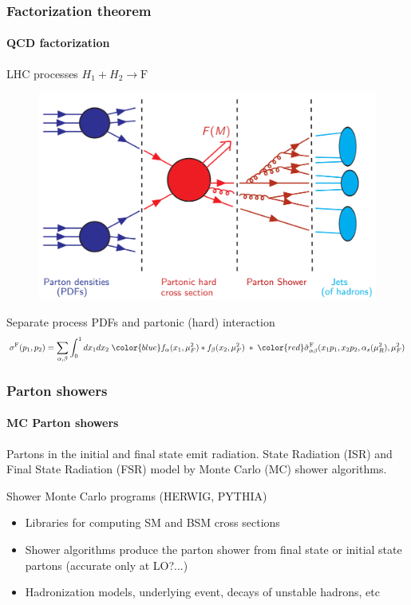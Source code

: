 \documentclass[aspectratio=43]{beamer}
\begin{document}
\begin{frame}

	\frametitle{Factorization theorem}
	\framesubtitle{QCD factorization}
	
	\center \footnotesize LHC processes $H_{1} + H_{2} \rightarrow \textrm{F}$
	
	\begin{figure}
		\includegraphics[width = 7 cm]{plots/factorization_1.png}
	\end{figure}
	
	\footnotesize {Separate process {\color{blue}PDFs} and {\color{red} partonic (hard) interaction}	
	\begin{equation}
		\sigma^{\textrm{F}}(p_{1}, p_{2}) = \sum_{\alpha, \beta}
		\int_{0}^{1} dx_{1} dx_{2} \; {\color{blue} f_{\alpha}(x_{1}, \mu_{F}^{2}) \ast f_{\beta}(x_{2}, \mu_{F}^{2})}
		\; \ast \;  
		{\color{red}\hat{\sigma}^{\textrm{F}}_{\alpha \beta}(x_{1}p_{1}, x_{2}p_{2}, \alpha_{s}(\mu_{R}^{2}), \mu_{F}^{2})} \nonumber
	\end{equation}}
		
\end{frame}

\begin{frame}

	\frametitle{Parton showers}
	\framesubtitle{MC Parton showers}
	
	\footnotesize Partons in the initial and final state emit radiation. State Radiation (ISR) and Final State Radiation (FSR) model by Monte Carlo (MC) shower algorithms.
	
	\vspace{0.1 cm}
	\center \color{red} Shower Monte Carlo programs (HERWIG, PYTHIA)
	\vspace{0.15 cm}
	
	\begin{itemize} 
		\item Libraries for computing SM and BSM cross sections
		\item Shower algorithms produce the parton shower from final state or initial state partons (accurate only at LO?...)
		\item Hadronization models, underlying event, decays of unstable hadrons, etc
	\end{itemize}

\end{frame}
\end{document}
